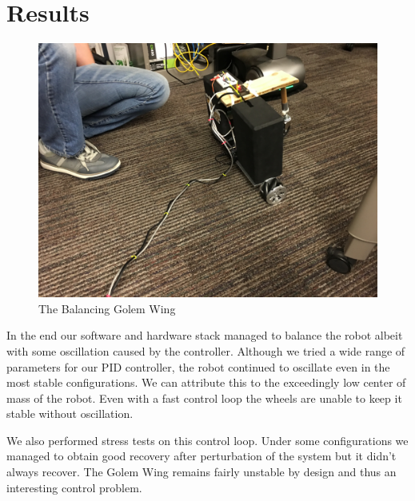 \documentclass[12pt,conference,onecolumn,titlepage]{IEEEtran} %
\begin{document}
\section{Results}
\label{sec:results}
\begin{figure}
  \centering
  \includegraphics[width=\textwidth]{2016-05-05_04_21_25.jpg}
  \caption{The Balancing Golem Wing}
  \label{fig:balancing}
\end{figure}
In the end our software and hardware stack managed to balance the robot albeit with some oscillation caused by the controller. Although we tried a wide range of parameters for our PID controller, the robot continued to oscillate even in the most stable configurations. We can attribute this to the exceedingly low center of mass of the robot. Even with a fast control loop the wheels are unable to keep it stable without oscillation.\par
We also performed stress tests on this control loop. Under some configurations we managed to obtain good recovery after perturbation of the system but it didn't always recover. The Golem Wing remains fairly unstable by design and thus an interesting control problem.\par
\end{document}
